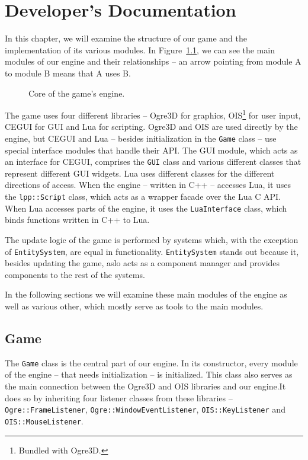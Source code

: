\chapter{Developer's Documentation}

In this chapter, we will examine the structure of our game and the implementation of its
various modules. In Figure~\ref{engine-layout}, we can see the main modules of our engine
and their relationships -- an arrow pointing from module A to module B means that A uses B.

\begin{figure}[h]
    \centering
    \selectfont
    \def\svgwidth{\columnwidth}
    
    \caption{Core of the game's engine.}
    \label{engine-layout}
\end{figure}

The game uses four different libraries -- Ogre3D for graphics, OIS\footnote{Bundled with Ogre3D.} for user input, CEGUI for
GUI and Lua for scripting. Ogre3D and OIS are used directly by the engine, but CEGUI and Lua -- besides initialization in the
\texttt{Game} class -- use special interface modules that handle their API. The GUI module, which acts as an interface
for CEGUI, comprises the \texttt{GUI} class and various different classes that represent different GUI widgets. Lua uses different
classes for the different directions of access. When the engine -- written in C++ -- accesses Lua, it uses the \texttt{lpp::Script} class,
which acts as a wrapper facade over the Lua C API. When Lua accesses parts of the engine, it uses the \texttt{LuaInterface} class,
which binds functions written in C++ to Lua.

The update logic of the game is performed by systems which, with the exception of \texttt{EntitySystem}, are equal in functionality.
\texttt{EntitySystem} stands out because it, besides updating the game, aslo acts as a component manager and provides components
to the rest of the systems.

In the following sections we will examine these main modules of the engine as well as various other, which mostly serve as tools
to the main modules.

\section{Game}

The \texttt{Game} class is the central part of our engine. In its constructor, every module of the engine -- that needs initialization --
is initialized. This class also serves as the main connection between the Ogre3D and OIS libraries and our engine.It does so by inheriting
four listener classes from these libraries -- \texttt{Ogre::FrameListener}, \texttt{Ogre::WindowEventListener}, \texttt{OIS::KeyListener}
and \texttt{OIS::MouseListener}.


